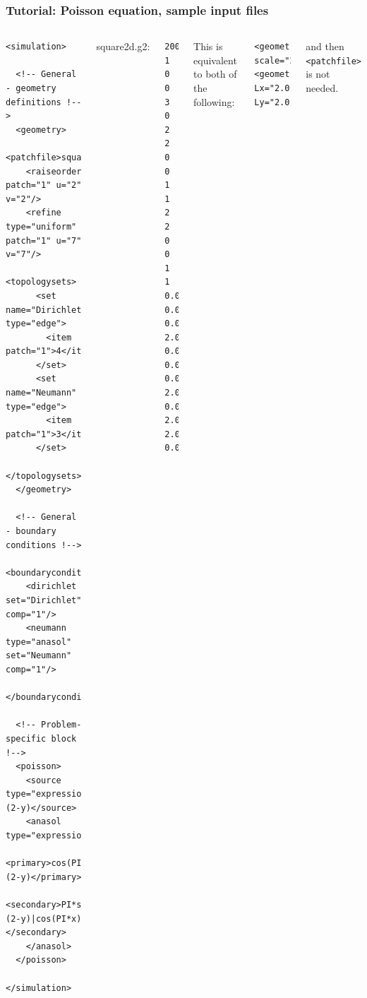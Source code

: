 \documentclass{beamer}
\begin{document}
\begin{frame}[fragile] %
 \frametitle{Tutorial: Poisson equation, sample input files}

 \begin{columns}[c]
  \tiny\begin{verbatim}
<simulation>

  <!-- General - geometry definitions !-->
  <geometry>
    <patchfile>square2D.g2</patchfile>
    <raiseorder patch="1" u="2" v="2"/>
    <refine type="uniform" patch="1" u="7" v="7"/>
    <topologysets>
      <set name="Dirichlet" type="edge">
        <item patch="1">4</item>
      </set>
      <set name="Neumann" type="edge">
        <item patch="1">3</item>
      </set>
    </topologysets>
  </geometry>

  <!-- General - boundary conditions !-->
  <boundaryconditions>
    <dirichlet set="Dirichlet" comp="1"/>
    <neumann type="anasol" set="Neumann" comp="1"/>
  </boundaryconditions>

  <!-- Problem-specific block !-->
  <poisson>
    <source type="expression">PI*PI*cos(PI*x)*(2-y)</source>
    <anasol type="expression">
      <primary>cos(PI*x)*(2-y)</primary>
      <secondary>PI*sin(PI*x)*(2-y)|cos(PI*x)</secondary>
    </anasol>
  </poisson>

</simulation>
  \end{verbatim}
  \tiny square2d.g2:
  \begin{verbatim}
200 1 0 0
3 0
2 2
0 0 1 1
2 2
0 0 1 1
0.0 0.0 0.0
2.0 0.0 0.0
0.0 2.0 0.0
2.0 2.0 0.0
  \end{verbatim}
  \pause
  \small This is equivalent to both of the following:
  \tiny\begin{verbatim}
<geometry scale="2.0"/>
<geometry Lx="2.0" Ly="2.0"/>
  \end{verbatim}
  \small and then {\scriptsize\tt <patchfile>} is not needed.
 \end{columns}
\end{frame}
\end{document}
